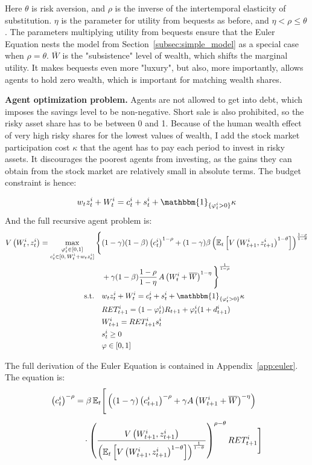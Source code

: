 \documentclass[12pt]{article}
\begin{document}
Here $\theta$ is risk aversion, and $\rho$ is the inverse of the intertemporal elasticity of substitution. $\eta$ is the parameter for utility from bequests as before, and $\eta<\rho \leq \theta$. The parameters multiplying utility from bequests ensure that the Euler Equation nests the model from Section~\ref{subsec:simple_model} as a special case when $\rho = \theta$. $\overline{W}$ is the "subsistence" level of wealth, which shifts the marginal utility. It makes bequests even more "luxury", but also, more importantly, allows agents to hold zero wealth, which is important for matching wealth shares.

\textbf{Agent optimization problem.} Agents are not allowed to get into debt, which imposes the savings level to be non-negative. Short sale is also prohibited, so the risky asset share has to be between 0 and 1. Because of the human wealth effect of very high risky shares for the lowest values of wealth, I add the stock market participation cost $\kappa$ that the agent has to pay each period to invest in risky assets. It discourages the poorest agents from investing, as the gains they can obtain from the stock market are relatively small in absolute terms. The budget constraint is hence:

\[
w_t z_t^i + W_t^i = c_t^i + s_t^i + \mathbbm{1}_{\{\varphi_t^i > 0\}} \kappa
\]
And the full recursive agent problem is:
\begin{align*}
V\left(W_t^i, z_t^i\right) = \max_{\substack{\varphi_t^i \in [0,1] \\ c_t^i \in [0, \, W_t^i + w_tz_t^i]}} 
\Bigg\{ &
(1 - \gamma)(1 - \beta) \left(c_t^i\right)^{1 - \rho} + (1 - \gamma) \beta 
\left( \mathbb{E}_t \left[ V\left(W_{t+1}^i, z_{t+1}^i\right)^{1 - \theta} \right] \right)^{\frac{1 - \rho}{1 - \theta}} \\
& + \gamma (1 - \beta) \frac{1 - \rho}{1 - \eta} 
\, A \left(W_t^i + \overline{W} \right)^{1 - \eta}
\Bigg\}^{\frac{1}{1 - \rho}} \\
\text{s.t.} \quad 
& w_t z_t^i + W_t^i = c_t^i + s_t^i + \mathbbm{1}_{\{\varphi_t^i > 0\}} \kappa \\
& RET_{t+1}^i=(1-\varphi_t^i) R_{t+1} + \varphi_t^i(1+d_{t+1}^i) \\
& W_{t+1}^i = RET_{t+1}^i s_t^i \\
& s_t^i \geq 0 \\
& \varphi \in [0,1]
\end{align*}

The full derivation of the Euler Equation is contained in Appendix~\ref{app:euler}. The equation is:
\begin{align*}
\left(c_t^i\right)^{-\rho} 
&= \beta \, \mathbb{E}_t \Bigg[
    \left( 
        (1 - \gamma) \left(c_{t+1}^i\right)^{-\rho} 
        + \gamma A\left(W_{t+1}^i + \overline{W} \right)^{-\eta} 
    \right) \notag \\[1ex]
&\quad \cdot 
    \left(
        \frac{
            V\left(W_{t+1}^i, z_{t+1}^i\right)
        }{
            \left( \mathbb{E}_t \left[ V\left(W_{t+1}^i, z_{t+1}^i\right)^{1 - \theta} \right] \right)^{\frac{1}{1 - \theta}}
        }
    \right)^{\rho - \theta}
    RET_{t+1}^i
\Bigg]
\end{align*}
\end{document}
